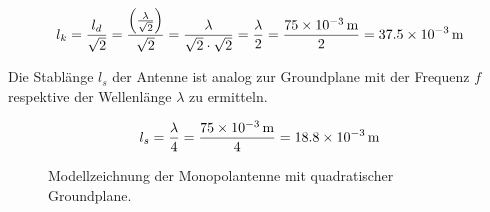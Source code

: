 \begin{equation}
	l_k
	= \frac{l_d}{\sqrt{2}}
	= \frac{\left(\frac{\lambda}{\sqrt{2}}\right)}{\sqrt{2}}
	= \frac{\lambda}{\sqrt{2} \cdot \sqrt{2}}
	= \frac{\lambda}{2}
	= \frac{\SI{75d-3}{\meter}}{2}
	= \SI{37.5d-3}{\meter}
\end{equation}

Die Stablänge $l_s$ der Antenne ist analog zur Groundplane mit der
Frequenz $f$ respektive der Wellenlänge $\lambda$ zu ermitteln.

\begin{equation}
	l_s
	= \frac{\lambda}{4}
	= \frac{\SI{75d-3}{\meter}}{4}
	= \SI{18.8d-3}{\meter}
\end{equation}

\begin{figure}[h!]
	\centering
	\def\svgwidth{0.5\textwidth}
	
	\caption{Modellzeichnung der Monopolantenne mit quadratischer
		Groundplane.}
\end{figure}
